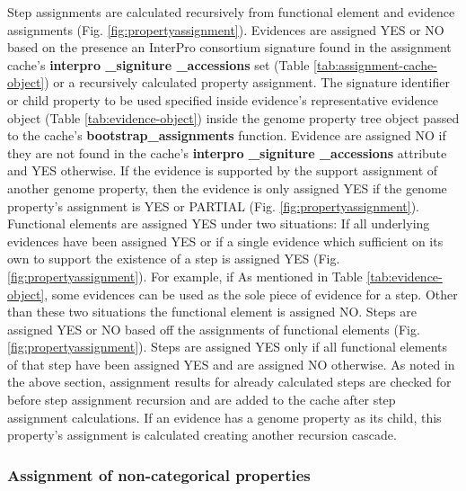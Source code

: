 Step assignments are calculated recursively from functional element and evidence assignments (Fig. \ref{fig:propertyassignment}). Evidences are assigned YES or NO based on the presence an InterPro consortium signature found in the assignment cache's \textbf{interpro \_signiture \_accessions} set (Table \ref{tab:assignment-cache-object}) or a recursively calculated property assignment. The signature identifier or child property to be used specified inside evidence's representative evidence object (Table \ref{tab:evidence-object}) inside the genome property tree object passed to the cache's \textbf{bootstrap\_assignments} function. Evidence are assigned NO if they are not found in the cache's \textbf{interpro \_signiture \_accessions} attribute and YES otherwise. If the evidence is supported by the support assignment of another genome property, then the evidence is only assigned YES if the genome property's assignment is YES or PARTIAL (Fig. \ref{fig:propertyassignment}).  Functional elements are assigned YES under two situations: If all underlying evidences have been assigned YES or if a single evidence which sufficient on its own to support the existence of a step is assigned YES (Fig. \ref{fig:propertyassignment}). For example, if As mentioned in Table \ref{tab:evidence-object}, some evidences can be used as the sole piece of evidence for a step. Other than these two situations the functional element is assigned NO. Steps are assigned YES or NO based off the assignments of functional elements (Fig. \ref{fig:propertyassignment}). Steps are assigned YES only if all functional elements of that step have been assigned YES and are assigned NO otherwise. As noted in the above section, assignment results for already calculated steps are checked for before step assignment recursion and are added to the cache after step assignment calculations. If an evidence has a genome property as its child, this property's assignment is calculated creating another recursion cascade.

\subsubsection{Assignment of non-categorical properties}

